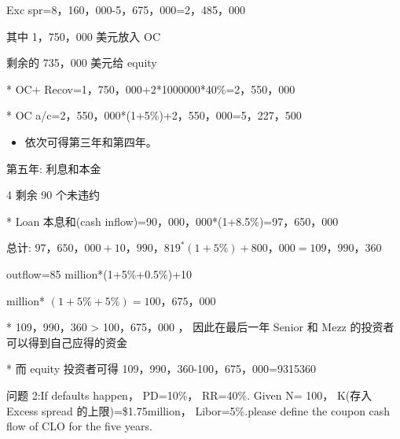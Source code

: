 Exc spr=8，160，000-5，675，000=2，485，000

其中 1，750，000 美元放入 OC

剩余的 735，000 美元给 equity



\hspace*{5em} * OC+ Recov=1，750，000+2*1000000*40\%=2，550，000

* OC a/c=2，550，000*(1+5\%)+2，550，000=5，227，500



\begin{itemize}
\item 依次可得第三年和第四年。
\end{itemize}

第五年: 利息和本金

4 剩余 90 个未违约

* Loan 本息和(cash inflow)=90，000，000*(1+8.5\%)=97，650，000

总计: \({97}，{650}，{000} + {10}，{990}，{819}^{ * }\left( {1 + 5\% }\right)  + {800}，{000} = {109}，{990}，{360}\)

outflow=85 million*(1+5\%+0.5\%)+10

million* \(\left( {1 + 5\%  + 5\% }\right)  = {100}，{675}，{000}\)

* 109，990，360 > 100，675，000 ， 因此在最后一年 Senior 和 Mezz 的投资者可以得到自己应得的资金

* 而 equity 投资者可得 109，990，360-100，675，000=9315360

 问题 2:If defaults happen， PD=10\%， RR=40\%. Given N= 100， K(存入 Excess spread 的上限)=\$1.75million， Libor=5\%.please define the coupon cash flow of CLO for the five years.

\begin{center}
\end{center}

